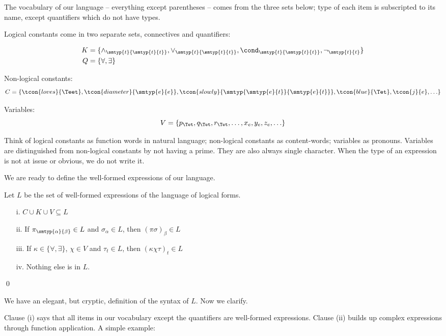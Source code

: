 \documentclass[11pt,a4paper,draft]{article}
\begin{document}
The vocabulary of our language -- everything except parentheses -- comes from the three sets below; type of each item is subscripted to its name, except quantifiers which do not have types.

Logical constants come in two separate sets, connectives and quantifiers:  

\begin{align*}
K &  =  \{\land_{\smtyp{t}{\smtyp{t}{t}}},\lor_{\smtyp{t}{\smtyp{t}{t}}},\cond_{\smtyp{t}{\smtyp{t}{t}}},\neg_{\smtyp{t}{t}}\}\\
Q & =  \{\forall,\exists\} 
\end{align*}

Non-logical constants: 
$$C=\{\tcon{loves}{\Teet},
\tcon{diameter}{\smtyp{e}{e}},
\tcon{slowly}{\smtyp{\smtyp{e}{t}}{\smtyp{e}{t}}},
\tcon{blue}{\Tet},
\tcon{j}{e},
\ldots\}$$

Variables: $$V=\{p_{\Tet},q_{\Tet},r_{\Tet},\ldots,x_{e},y_{e},z_{e},\ldots\}$$

Think of logical constants as function words in natural language; non-logical constants as content-words; variables as pronouns. Variables are distinguished from non-logical constants by not having a prime. They are also always single character. When the type of an expression is not at issue or obvious, we do not write it.

We are ready to define the well-formed expressions of our language.


Let $L$ be the set of well-formed expressions of the language of logical forms.

\begin{udefinition}[Syntax of $L$]\label{Lsyn}
\begin{itemize}
\item[]
\item[i.] $C\cup K\cup V \subseteq L$
\item[ii.] If $\pi_{\smtyp{\alpha}{\beta}} \in L$ and $\sigma_{\alpha} \in L$, then $(\pi\sigma)_{\beta} \in L$
\item[iii.] If $\kappa \in \{\forall,\exists\}$, $\chi \in V$ and $\tau_{t} \in L$, then $(\kappa \chi \tau)_{t} \in L$
\item[iv.] Nothing else is in $L$.
\end{itemize}
\qed
\end{udefinition}

We have an elegant, but cryptic, definition of the syntax of $L$. Now we clarify. 

Clause (i) says that all items in our vocabulary except the quantifiers are well-formed expressions. 
Clause (ii) builds up complex expressions through function application. A simple example:
\end{document}
